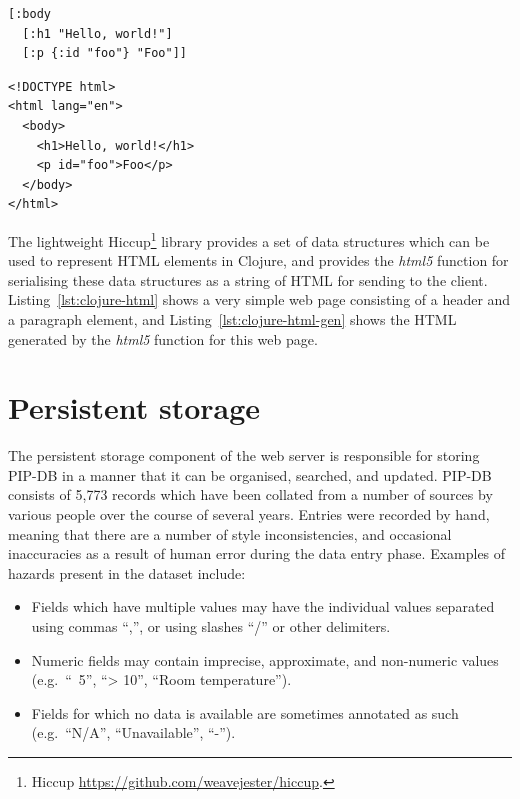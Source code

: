 \lstset{language=clojure}
\begin{lstlisting}[label=lst:clojure-html,caption={%
      [Example Clojure representation of HTML elements]
       Example Clojure representation of HTML elements.}]
[:body
  [:h1 "Hello, world!"]
  [:p {:id "foo"} "Foo"]]
\end{lstlisting}


\lstset{language=html}
\begin{lstlisting}[label=lst:clojure-html-gen,caption={%
      [Generated HTML from the Clojure example]
       The HTML which is generated evaluation of the Clojure example.}]
<!DOCTYPE html>
<html lang="en">
  <body>
    <h1>Hello, world!</h1>
    <p id="foo">Foo</p>
  </body>
</html>
\end{lstlisting}


The lightweight Hiccup\footnote{Hiccup
  \url{https://github.com/weavejester/hiccup}.}  library provides a
set of data structures which can be used to represent HTML elements in
Clojure, and provides the \textit{html5} function for serialising
these data structures as a string of HTML for sending to the client.
Listing~\ref{lst:clojure-html} shows a very simple web page consisting
of a header and a paragraph element, and
Listing~\ref{lst:clojure-html-gen} shows the HTML generated by the
\textit{html5} function for this web page.

\section{Persistent storage}\label{sec:persistent-storage}

The persistent storage component of the web server is responsible for
storing PIP-DB in a manner that it can be organised, searched, and
updated. PIP-DB consists of 5,773 records which have been collated
from a number of sources by various people over the course of several
years. Entries were recorded by hand, meaning that there are a number
of style inconsistencies, and occasional inaccuracies as a result of
human error during the data entry phase. Examples of hazards present
in the dataset include:

\begin{itemize}
\item Fields which have multiple values may have the individual values
  separated using commas ``,'', or using slashes ``/'' or other
  delimiters.
\item Numeric fields may contain imprecise, approximate, and
  non-numeric values (e.g.\ ``~5'', ``> 10'', ``Room temperature'').
\item Fields for which no data is available are sometimes annotated as
  such (e.g.\ ``N/A'', ``Unavailable'', ``-'').
\end{itemize}


